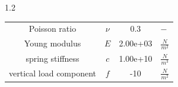 \documentclass[preview]{standalone}
\begin{document}
\begin{spacing}{1.2}
\begin{tabular}{cccl}
\toprule
Poisson ratio & $\nu$ & 0.3 & $-$ \\ 
Young modulus & $E$ & 2.00e+03 & $\frac{N}{m^2}$ \\ 
spring stiffness & $c$ & 1.00e+10 & $\frac{N}{m^3}$ \\ 
vertical load component & $f$ & -10 & $\frac{N}{m^2}$ \\ 
\bottomrule
\end{tabular}
\end{spacing}
\end{document}
